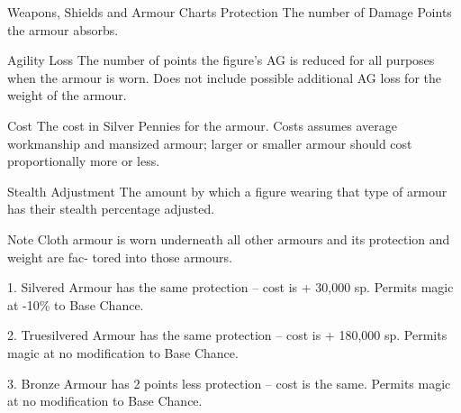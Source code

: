 \begin{Tables}{Weapons, Shields and Armour Charts}
Protection The number of Damage Points the armour absorbs.

Agility Loss The number of points the figure’s AG is reduced for all
purposes when the armour is worn. Does not include possible additional
AG loss for the weight of the armour.

Cost The cost in Silver Pennies for the armour.  Costs assumes average
workmanship and mansized armour; larger or smaller armour should
cost proportionally more or less.

Stealth Adjustment The amount by which a figure wearing that type of
armour has their stealth percentage adjusted.

Note Cloth armour is worn underneath all other armours and its
protection and weight are fac- tored into those armours.

1.  Silvered Armour has the same protection – cost is + 30,000 sp.
Permits magic at -10\% to Base Chance.

2.  Truesilvered Armour has the same protection – cost is + 180,000
sp. Permits magic at no modification to Base Chance.

3. Bronze Armour has 2 points less protection – cost is the same.
Permits magic at no modification to Base Chance.

\end{Tables}
